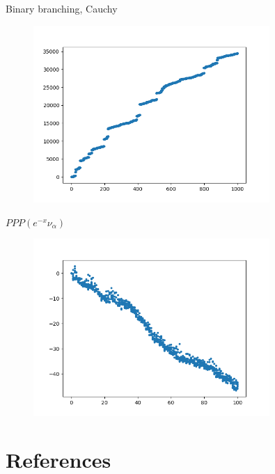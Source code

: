 \documentclass{beamer}
\begin{document}
\begin{frame}{Binary branching, Cauchy}
\begin{figure}
\includegraphics[width=0.8\textwidth]{graphics/cauchy.png}
\end{figure}
\end{frame}

\begin{frame}{$PPP(e^{-x} \nu_\alpha)$}
\begin{figure}
\includegraphics[width=0.8\textwidth]{graphics/cauchy_PPP.png}
\end{figure}
\end{frame}



\section{References}


\end{document}
